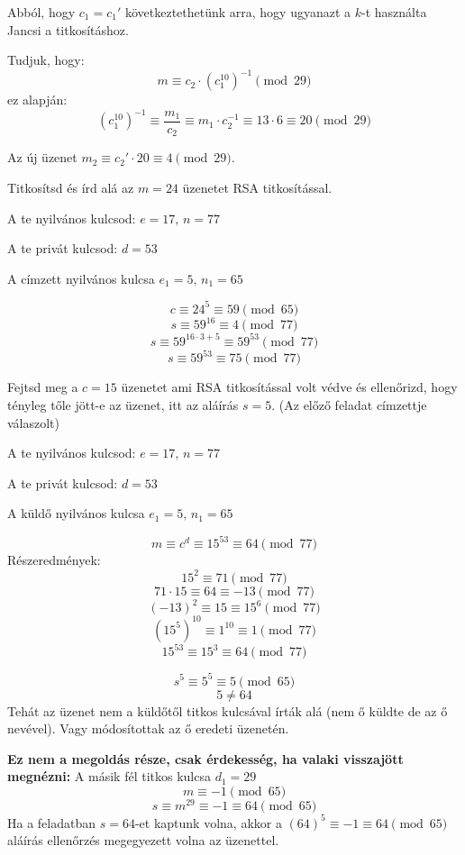 \begin{solution}
\hspace{0em}\vspace{1em}

Abból, hogy $c_{1}=c_{1}'$ következtethetünk arra, hogy ugyanazt
a $k$-t használta Jancsi a titkosításhoz.

Tudjuk, hogy: 
\[
m\equiv c_{2}\cdot(c_{1}^{10})^{-1}\pmod{29}
\]
ez alapján: 
\[
(c_{1}^{10})^{-1}\equiv\frac{m_{1}}{c_{2}}\equiv m_{1}\cdot c_{2}^{-1}\equiv13\cdot6\equiv20\pmod{29}
\]

Az új üzenet $m_{2}\equiv c_{2}'\cdot20\equiv4\pmod{29}$.
\end{solution}
\begin{problem}
Titkosítsd és írd alá az $m=24$ üzenetet RSA titkosítással.

A te nyilvános kulcsod: $e=17,\,n=77$

A te privát kulcsod: $d=53$

A címzett nyilvános kulcsa $e_{1}=5,\,n_{1}=65$ 
\end{problem}

\begin{solution}
\hspace{0em}\vspace{1em}

\[
c\equiv24^{5}\equiv59\pmod{65}
\]
\[
s\equiv59^{16}\equiv4\pmod{77}
\]
\[
s\equiv59^{16\cdot3+5}\equiv59^{53}\pmod{77}
\]
\[
s\equiv59^{53}\equiv75\pmod{77}
\]
\end{solution}
\begin{problem}
Fejtsd meg a $c=15$ üzenetet ami RSA titkosítással volt védve és
ellenőrizd, hogy tényleg tőle jött-e az üzenet, itt az aláírás $s=5$.
(Az előző feladat címzettje válaszolt)

A te nyilvános kulcsod: $e=17,\,n=77$

A te privát kulcsod: $d=53$

A küldő nyilvános kulcsa $e_{1}=5,\,n_{1}=65$ 
\end{problem}

\begin{solution}
\hspace{0em}\vspace{1em}

\[
m\equiv c^{d}\equiv15^{53}\equiv64\pmod{77}
\]
Részeredmények: 
\[
15^{2}\equiv71\pmod{77}
\]
\[
71\cdot15\equiv64\equiv-13\pmod{77}
\]
\[
(-13)^{2}\equiv15\equiv15^{6}\pmod{77}
\]
\[
(15^{5})^{10}\equiv1^{10}\equiv1\pmod{77}
\]
\[
15^{53}\equiv15^{3}\equiv64\pmod{77}
\]

\[
s^{5}\equiv5^{5}\equiv5\pmod{65}
\]
\[
5\neq64
\]
Tehát az üzenet nem a küldőtől titkos kulcsával írták alá (nem ő küldte
de az ő nevével). Vagy módosítottak az ő eredeti üzenetén.

\textbf{Ez nem a megoldás része, csak érdekesség, ha valaki visszajött
megnézni:} A másik fél titkos kulcsa $d_{1}=29$ 
\[
m\equiv-1\pmod{65}
\]
\[
s\equiv m^{29}\equiv-1\equiv64\pmod{65}
\]
Ha a feladatban $s=64$-et kaptunk volna, akkor a $(64)^{5}\equiv-1\equiv64\pmod{65}$
aláírás ellenőrzés megegyezett volna az üzenettel. 
\end{solution}

